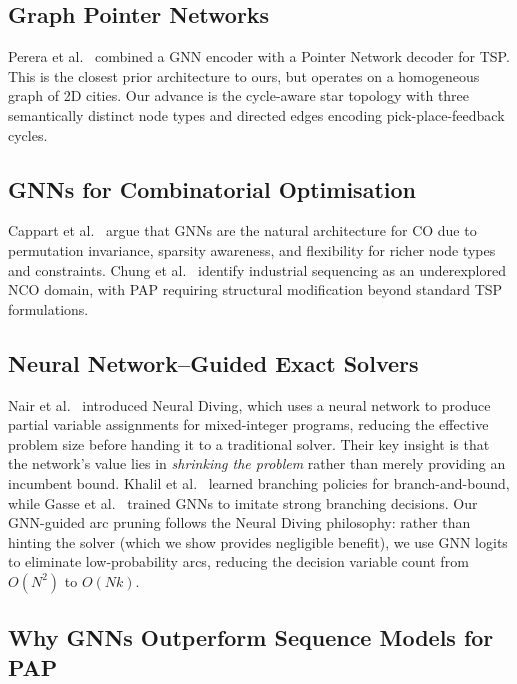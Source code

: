 \documentclass[conference]{IEEEtran}
\begin{document}
\subsection{Graph Pointer Networks}

Perera et al.\ \cite{perera2023gpn} combined a GNN encoder with a Pointer Network decoder for TSP. This is the closest prior architecture to ours, but operates on a homogeneous graph of 2D cities. Our advance is the cycle-aware star topology with three semantically distinct node types and directed edges encoding pick-place-feedback cycles.

\subsection{GNNs for Combinatorial Optimisation}

Cappart et al.\ \cite{cappart2023gnnco} argue that GNNs are the natural architecture for CO due to permutation invariance, sparsity awareness, and flexibility for richer node types and constraints. Chung et al.\ \cite{chung2025ncosurvey} identify industrial sequencing as an underexplored NCO domain, with PAP requiring structural modification beyond standard TSP formulations.

\subsection{Neural Network--Guided Exact Solvers}

Nair et al.\ \cite{nair2021neural} introduced Neural Diving, which uses a neural network to produce partial variable assignments for mixed-integer programs, reducing the effective problem size before handing it to a traditional solver. Their key insight is that the network's value lies in \emph{shrinking the problem} rather than merely providing an incumbent bound. Khalil et al.\ \cite{khalil2016learning} learned branching policies for branch-and-bound, while Gasse et al.\ \cite{gasse2019exact} trained GNNs to imitate strong branching decisions. Our GNN-guided arc pruning follows the Neural Diving philosophy: rather than hinting the solver (which we show provides negligible benefit), we use GNN logits to eliminate low-probability arcs, reducing the decision variable count from $O(N^2)$ to $O(Nk)$.

\subsection{Why GNNs Outperform Sequence Models for PAP}
\end{document}
